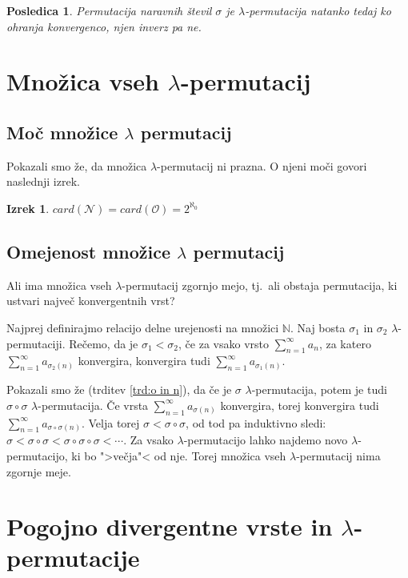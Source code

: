 \documentclass[12pt,a4paper,reqno]{amsart}
\theoremstyle{definition} %
\theoremstyle{plain} %
\newtheorem{izrek}[definicija]{Izrek}
\newtheorem{posledica}[definicija]{Posledica}
\begin{document}
\begin{posledica}
Permutacija naravnih števil $\sigma$ je $\lambda$-permutacija natanko tedaj ko ohranja konvergenco, njen inverz pa ne.
\end{posledica}

\section{Množica vseh $\lambda$-permutacij}

\subsection{Moč množice $\lambda$ permutacij}

Pokazali smo že, da množica $\lambda$-permutacij ni prazna.
O njeni moči govori naslednji izrek.

\begin{izrek}
$card(\mathcal{N})=card(\mathcal{O})=2^{\aleph_0}$
\end{izrek}

\subsection{Omejenost množice $\lambda$ permutacij}

Ali ima množica vseh $\lambda$-permutacij zgornjo mejo, tj.\ ali obstaja permutacija, ki ustvari največ konvergentnih vrst?

Najprej definirajmo relacijo delne urejenosti na množici $ \mathbb{N}$. Naj bosta $\sigma _1$ in $\sigma _2$ $\lambda$-permutaciji. Rečemo, da je $\sigma_1 < \sigma_2$, če za vsako vrsto $\sum^{\infty}_{n=1}a_n$, za katero $\sum^{\infty}_{n=1}a_{\sigma_2(n)}$ konvergira, konvergira tudi $\sum^{\infty}_{n=1}a_{\sigma_1(n)}$. 

Pokazali smo že (trditev \ref{trd:o in n}), da če je $\sigma$ $\lambda$-permutacija, potem je tudi $\sigma \circ \sigma$  $\lambda$-permutacija. Če vrsta $\sum^{\infty}_{n=1}a_{\sigma(n)}$ konvergira, torej konvergira tudi $\sum^{\infty}_{n=1}a_{\sigma \circ \sigma(n)}$. Velja torej $\sigma < \sigma \circ \sigma$, od tod pa induktivno sledi: $\sigma < \sigma \circ \sigma < \sigma \circ \sigma \circ \sigma < \cdots$. Za vsako $\lambda$-permutacijo lahko najdemo novo $\lambda$-permutacijo, ki bo ">večja"< od nje. Torej množica vseh $\lambda$-permutacij nima zgornje meje. 


\section{Pogojno divergentne vrste in $\lambda$-permutacije}
\end{document}
